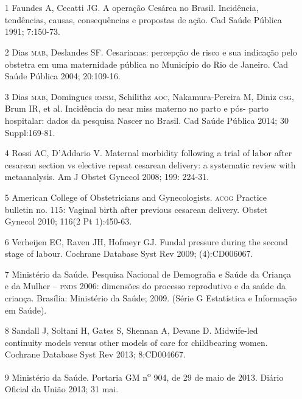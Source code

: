 \documentclass{article}
\begin{document}
\section*{}
\begin{itemize}

\item[1] Faundes A, Cecatti JG. A operação Cesárea no Brasil. Incidência,
tendências, causas, consequências e propostas de ação. Cad Saúde Pública 1991;
7:150-73.

\item[2] Dias \textsc{mab}, Deslandes SF. Cesarianas: percepção de risco e sua
indicação pelo obstetra em uma maternidade pública no Município do Rio de
Janeiro. Cad Saúde Pública 2004; 20:109-16.

\item[3] Dias \textsc{mab}, Domingues \textsc{rmsm}, Schilithz \textsc{aoc}, Nakamura-Pereira M, Diniz
\textsc{csg}, Brum IR, et al. Incidência do near miss materno no parto e pós- parto
hospitalar: dados da pesquisa Nascer no Brasil. Cad Saúde Pública 2014; 30
Suppl:169-81.

\item[4] Rossi AC, D’Addario V. Maternal morbidity following a trial of
labor after cesarean section vs elective repeat cesarean delivery: a systematic
review with metaanalysis. Am J Obstet Gynecol 2008; 199:
224-31.

\item[5] American College of Obstetricians and Gynecologists. \textsc{acog} Practice
bulletin no. 115: Vaginal birth after previous cesarean delivery. Obstet Gynecol
2010; 116(2 Pt 1):450-63.

\item[6] Verheijen EC, Raven JH, Hofmeyr GJ. Fundal pressure during the
second stage of labour. Cochrane Database Syst Rev 2009;
(4):CD006067.

\item[7] Ministério da Saúde. Pesquisa Nacional de Demografia e Saúde da
Criança e da Mulher – \textsc{pnds} 2006: dimensões do processo reprodutivo e da saúde da
criança. Brasília: Ministério da Saúde; 2009. (Série G Estatística e Informação
em Saúde).

\item[8] Sandall J, Soltani H, Gates S, Shennan A, Devane D. Midwife-led
continuity models versus other models of care for childbearing women. Cochrane
Database Syst Rev 2013; 8:CD004667.

\item[9] Ministério da Saúde. Portaria GM
n\textsuperscript{o}
904, de 29 de maio de 2013. Diário
Oficial da União 2013; 31 mai.


\end{itemize}
\end{document}
